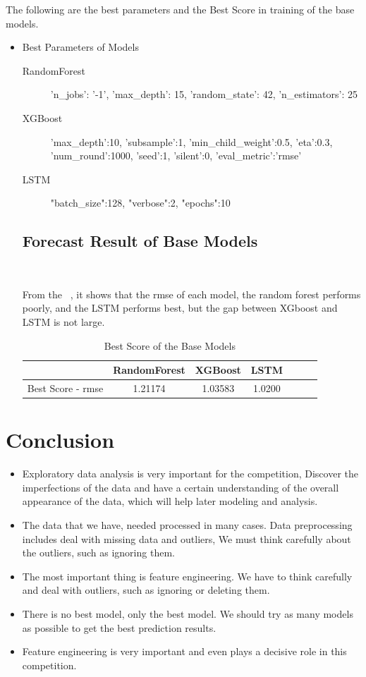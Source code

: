 The following are the best parameters and 
the Best Score in training of 
the base models. 

\begin{itemize}
	\item Best Parameters of Models
	\begin{description}
		\item[RandomForest] 'n_jobs': '-1', 'max_depth': 15, 
		'random_state': 42, 'n_estimators': 25
		\item[XGBoost] 'max_depth':10, 
		'subsample':1,
		'min_child_weight':0.5,
		'eta':0.3, 
		'num_round':1000, 
		'seed':1,
		'silent':0,
		'eval_metric':'rmse'
		\item[LSTM] "batch_size":128,
		"verbose":2,
		"epochs":10
	\end{description}


\subsection{Forecast Result of Base Models}
\

From the  ~,
it shows that the rmse of 
each model, the random forest 
performs poorly, and the LSTM 
performs best, but the gap between 
XGboost and LSTM is not large.

\begin{table}[h]  \centering
	\caption{Best Score of the Base Models}
	\label{tbl:best_score_base_models_old}
	\begin{tabular}{ccccccc}
		\toprule
		& RandomForest & XGBoost & LSTM\\
		\midrule
		Best Score - rmse & 1.21174 & 1.03583 & 1.0200\\
		\bottomrule
	\end{tabular}
\end{table}
\end{itemize}


\section{Conclusion}

\begin{itemize}
	\item Exploratory data analysis is 
	very important for the competition,
	Discover the imperfections of the 
	data and have a certain understanding 
	of the overall appearance of the data, 
	which will help later modeling and analysis. 
	\item The data that we have,
	needed processed in many cases.
	Data preprocessing includes 
	deal with missing data and outliers, 
	We must think carefully about the outliers, 
	such as ignoring them.
	\item The most important thing is
	feature engineering.
	We have to think carefully and 
	deal with outliers, such as ignoring 
	or deleting them.
	\item There is no best model, 
	only the best model. We should 
	try as many models as possible to 
	get the best prediction results. 
	\item Feature engineering is very 
	important and even plays a decisive 
	role in this competition.	
\end{itemize}

